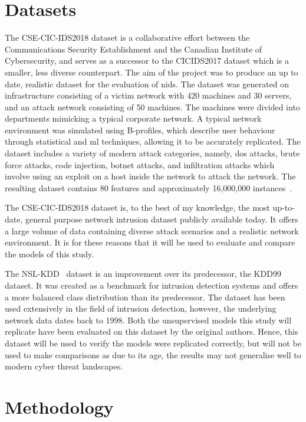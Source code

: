 \section{Datasets}%
\label{sec:datasets}
The CSE-CIC-IDS2018 dataset is a collaborative effort between the
Communications Security Establishment and the Canadian Institute of Cybersecurity,
and serves as a successor to the CICIDS2017 dataset which is a smaller, less
diverse counterpart. The aim of the project was to produce an up to date,
realistic dataset for the evaluation of \gls{nids}. The dataset was generated
on infrastructure consisting of a victim network with 420 machines and 30
servers, and an attack network consisting of 50 machines. The machines were
divided into departments mimicking a typical corporate network. A typical
network environment was simulated using B-profiles, which describe user
behaviour through statistical and \gls{ml} techniques, allowing it to be
accurately replicated. The dataset includes a variety of modern attack
categories, namely, \gls{dos} attacks, brute force attacks, code injection,
botnet attacks, and infiltration attacks which involve using an exploit on a
host inside the network to attack the network. The resulting dataset contains
80 features and approximately 16,000,000 instances~\cite{cic2018, cic2018data}.

The CSE-CIC-IDS2018 dataset is, to the best of my knowledge, the most
up-to-date, general purpose network intrusion dataset publicly available today.
It offers a large volume of data containing diverse attack scenarios and a
realistic network environment. It is for these reasons that it will be used to
evaluate and compare the models of this study.

The NSL-KDD~\cite{nsl} dataset is an improvement over its predecessor, the
KDD99 dataset. It was created as a benchmark for intrusion detection systems
and offers a more balanced class distribution than its predecessor. The dataset
has been used extensively in the field of intrusion detection, however, the
underlying network data dates back to 1998. Both the unsupervised models this
study will replicate have been evaluated on this dataset by the original
authors. Hence, this dataset will be used to verify the models were replicated
correctly, but will not be used to make comparisons as due to its age, the
results may not generalise well to modern cyber threat landscapes.

\section{Methodology}%
\label{sec:methodology}

